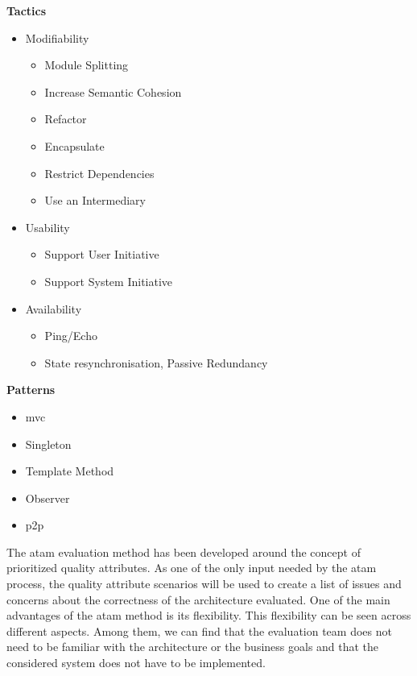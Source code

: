 \begin{minipage}[t]{0.475\linewidth}
  \textbf{Tactics}
  \begin{itemize}
    \item Modifiability
    \begin{itemize}
      \item Module Splitting
      \item Increase Semantic Cohesion
      \item Refactor
      \item Encapsulate
      \item Restrict Dependencies
      \item Use an Intermediary
    \end{itemize}
    \item Usability
    \begin{itemize}
      \item Support User Initiative
      \item Support System Initiative
    \end{itemize}
    \item Availability
    \begin{itemize}
      \item Ping/Echo
      \item State resynchronisation, \newline Passive Redundancy
    \end{itemize}
  \end{itemize}
\end{minipage}
\hfill
\begin{minipage}[t]{0.475\linewidth}
  \textbf{Patterns}
  \begin{itemize}
    \item \gls{mvc}
    \item Singleton
    \item Template Method
    \item Observer
    \item \gls{p2p}
  \end{itemize}
\end{minipage}

The \gls{atam} evaluation method has been developed around the concept of prioritized quality attributes. As one of the only input needed by the \gls{atam} process, the quality attribute scenarios will be used to create a list of issues and concerns about the correctness of the architecture evaluated. One of the main advantages of the \gls{atam} method is its flexibility. This flexibility can be seen across different aspects. Among them, we can find that the evaluation team does not need to be familiar with the architecture or the business goals and that the considered system does not have to be implemented.  \cite[Chapter 21, Section 2]{bass2013}

